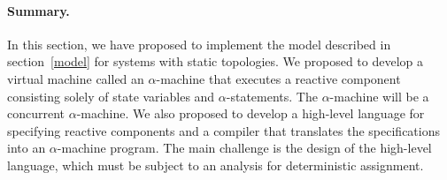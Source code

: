 \paragraph{Summary.}
In this section, we have proposed to implement the model described in section~\ref{model} for systems with static topologies.
We proposed to develop a virtual machine called an $\alpha$-machine that executes a reactive component consisting solely of state variables and $\alpha$-statements.
The $\alpha$-machine will be a concurrent $\alpha$-machine.
We also proposed to develop a high-level language for specifying reactive components and a compiler that translates the specifications into an $\alpha$-machine program.
The main challenge is the design of the high-level language, which must be subject to an analysis for deterministic assignment.

